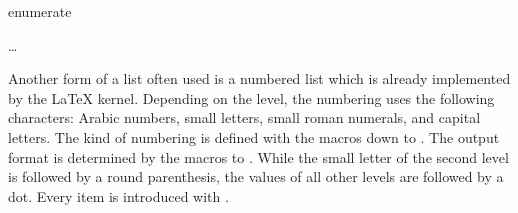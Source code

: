   \begin{Declaration}
    \begin{Environment}{enumerate}
      \begin{Body}
         \dots
        \BodyDots
      \end{Body}
    \end{Environment}
  \end{Declaration}%
  Another form of a list often used is a numbered list which is already
  implemented by the {\LaTeX} kernel. Depending on the level, the
  numbering uses the following characters: Arabic numbers,
  small letters, small roman numerals, and capital letters. The kind of
  numbering is defined with the macros  down to
  . The output format is determined by the macros
   to . While the small letter of the
  second level is followed by a round parenthesis, the values of all other
  levels are followed by a dot. Every item is introduced with .%
